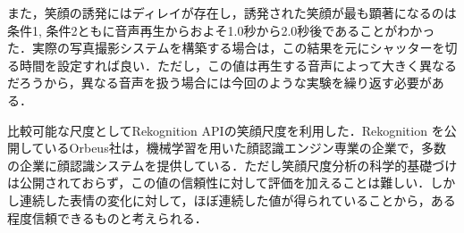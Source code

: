 \documentclass[submit,techreq]{ec2014}
\begin{document}
また，笑顔の誘発にはディレイが存在し，誘発された笑顔が最も顕著になるのは条件1, 条件2ともに音声再生からおよそ1.0秒から2.0秒後であることがわかった．実際の写真撮影システムを構築する場合は，この結果を元にシャッターを切る時間を設定すれば良い．ただし，この値は再生する音声によって大きく異なるだろうから，異なる音声を扱う場合には今回のような実験を繰り返す必要がある．

比較可能な尺度としてRekognition APIの笑顔尺度を利用した．Rekognition を公開しているOrbeus社は，機械学習を用いた顔認識エンジン専業の企業で，多数の企業に顔認識システムを提供している\cite{Orbeus}．ただし笑顔尺度分析の科学的基礎づけは公開されておらず，この値の信頼性に対して評価を加えることは難しい．しかし連続した表情の変化に対して，ほぼ連続した値が得られていることから，ある程度信頼できるものと考えられる．

%
%
%
%
%
%
\end{document}
